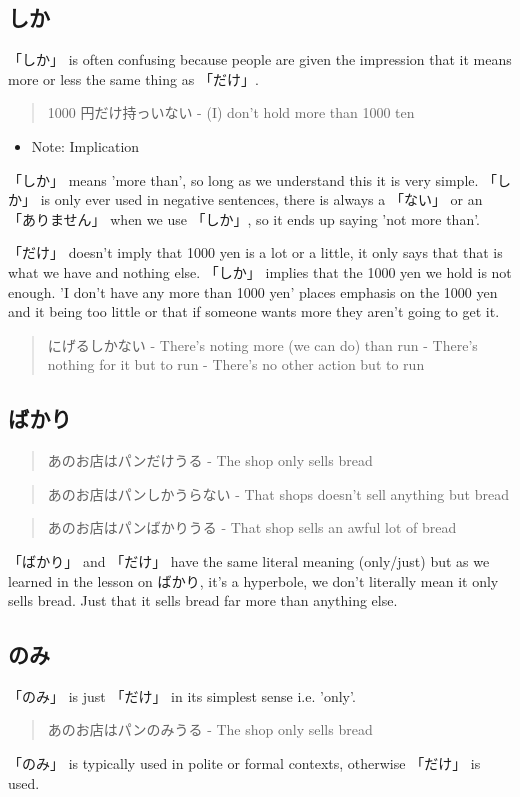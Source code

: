 \documentclass[11pt]{article}
\begin{document}
\subsection{しか}
\label{sec:org39f9553}
「しか」 is often confusing because people are given the impression that it means more or less the same thing as 「だけ」.
\begin{quote}
1000 円だけ持っいない - (I) don't hold more than 1000 ten
\end{quote}
\begin{itemize}
\item Note: Implication
\end{itemize}
「しか」 means 'more than', so long as we understand this it is very simple. 「しか」 is only ever used in negative sentences, there is always a 「ない」 or an 「ありません」 when we use 「しか」, so it ends up saying 'not more than'.

「だけ」 doesn't imply that 1000 yen is a lot or a little, it only says that that is what we have and nothing else. 「しか」 implies that the 1000 yen we hold is not enough. 'I don't have any more than 1000 yen' places emphasis on the 1000 yen and it being too little or that if someone wants more they aren't going to get it.

\begin{quote}
にげるしかない - There's noting more (we can do) than run - There's nothing for it but to run - There's no other action but to run
\end{quote}

\subsection{ばかり}
\label{sec:org15a1d84}
\begin{quote}
あのお店はパンだけうる - The shop only sells bread
\end{quote}
\begin{quote}
あのお店はパンしかうらない - That shops doesn't sell anything but bread
\end{quote}
\begin{quote}
あのお店はパンばかりうる - That shop sells an awful lot of bread
\end{quote}
「ばかり」 and 「だけ」 have the same literal meaning (only/just) but as we learned in the lesson on ばかり, it's a hyperbole, we don't literally mean it only sells bread. Just that it sells bread far more than anything else.

\subsection{のみ}
\label{sec:org7757da9}
「のみ」 is just 「だけ」 in its simplest sense i.e. 'only'.
\begin{quote}
あのお店はパンのみうる - The shop only sells bread
\end{quote}
「のみ」 is typically used in polite or formal contexts, otherwise 「だけ」 is used.
\end{document}
